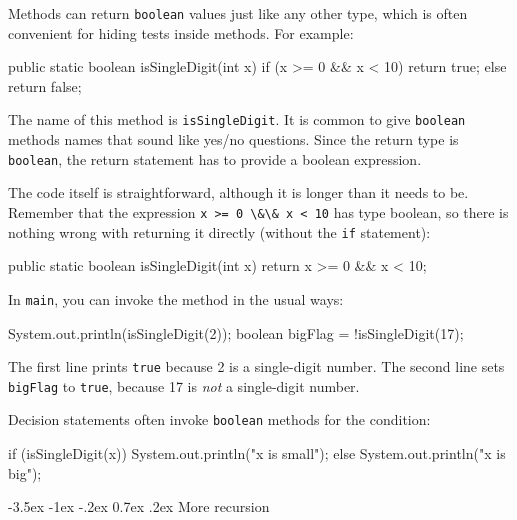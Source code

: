 \documentclass[12pt]{book}
\makeatletter
\theoremstyle{exercise}
\newcommand{\java}[1]{\verb"#1"}
\renewcommand{\section}{\@startsection{section}{1}{\z@}%
    {-3.5ex \@plus -1ex \@minus -.2ex}%
    {0.7ex \@plus.2ex}%
    {\normalfont\Large\bfseries}}
\newcommand{\java}[1]{\lstinline{#1}} %
\makeatother
\begin{document}
Methods can return \java{boolean} values just like any other type, which is often convenient for hiding tests inside methods.
For example:

\begin{code}
    public static boolean isSingleDigit(int x) {
        if (x >= 0 && x < 10) {
            return true;
        } else {
            return false;
        }
    }
\end{code}

The name of this method is \java{isSingleDigit}.
It is common to give \java{boolean} methods names that sound like yes/no questions.
Since the return type is \java{boolean}, the return statement has to provide a boolean expression.

The code itself is straightforward, although it is longer than it needs to be.
Remember that the expression \java{x >= 0 \&\& x < 10} has type boolean, so there is nothing wrong with returning it directly (without the \java{if} statement):

\begin{code}
    public static boolean isSingleDigit(int x) {
        return x >= 0 && x < 10;
    }
\end{code}

In \java{main}, you can invoke the method in the usual ways:

\begin{code}
    System.out.println(isSingleDigit(2));
    boolean bigFlag = !isSingleDigit(17);
\end{code}

The first line prints \java{true} because 2 is a single-digit number.
The second line sets \java{bigFlag} to \java{true}, because 17 is {\em not} a single-digit number.

Decision statements often invoke \java{boolean} methods for the condition:

\begin{code}
    if (isSingleDigit(x)) {
        System.out.println("x is small");
    } else {
        System.out.println("x is big");
    }
\end{code}


\section{More recursion}
\label{factorial}


\end{document}
